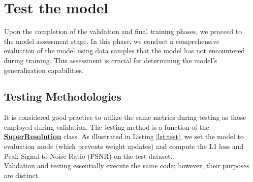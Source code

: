 \documentclass[../report.tex]{subfiles}
\begin{document}
\section{Test the model}
Upon the completion of the validation and final training phases, we proceed to the model assessment stage. In this phase, we conduct a comprehensive evaluation of the model using data samples that the model has not encountered during training. This assessment is crucial for determining the model's generalization capabilities.
\subsection{Testing Methodologies}
It is considered good practice to utilize the same metrics during testing as those employed during validation. The testing method is a function of the \href{https://github.com/cMancio00/Super-Resolution/blob/main/SRM/network.py}{\textbf{SuperResolution}} class. As illustrated in Listing \ref{lst:test}, we set the model to evaluation mode (which prevents weight updates) and compute the L1 loss and Peak Signal-to-Noise Ratio (PSNR) on the test dataset.\\
Validation and testing essentially execute the same code; however, their purposes are distinct.
\end{document}
